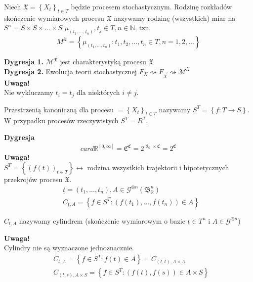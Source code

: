 \begin{defi}
Niech $ \mathfrak X=\left\{X_t\right\} _{t\in T}$ będzie procesem stochastycznym. Rodzinę rozkładów skończenie wymiarowych procesu $ \mathfrak X $ nazywamy rodzinę (wszystkich) miar na $ S^n=S\times S\times \dots\times S $ $ \mu_{(t_1,\dots,t_n)},t_j\in T,n\in \mathbb N $, tzn.
\begin{gather*}
M^\mathfrak X=\left\{\mu_{(t_1,\dots,t_n)}:t_1,t_2,\dots,t_n\in T,n=1,2,\dots \right\}
\end{gather*}
\end{defi}
\textbf{Dygresja 1.} $ \mathcal M^\mathfrak X $ jest charakterystyką procesu $ \mathfrak X $\\
\textbf{Dygresja 2.} Ewolucja teorii stochastycznej $ F_X\rightsquigarrow F_{\vec X}\rightsquigarrow\mathcal M^\mathfrak X $\\
\textbf{Uwaga!}\\
Nie wykluczamy $ t_i=t_j $ dla niektórych $ i\neq j $.
\begin{defi}
Przestrzenią kanoniczną dla procesu $ \mathfrak=\left\{X_t\right\} _{t\in T}$ nazywamy $ S^T=\left\{f:T\to S\right\} $. W przypadku procesów rzeczywistych $ S^T=R^T $.
\end{defi}
\textbf{Dygresja}
\begin{gather*}
card \mathbb R ^{[0,\infty ]}=\mathfrak C^\mathfrak C=2^{\aleph_0\times \mathfrak C}=2^\mathfrak C
\end{gather*}
\textbf{Uwaga!}\\
$ S^T=\left\{\left(f(t)\right)_{t\in T}\right\} \leftrightarrow $  rodzina wszystkich trajektorii i hipotetycznych przekrojów procesu $ \mathfrak X $.
\begin{align*}
&\underline t=\left(t_1,\dots,t_n\right), A\in\mathcal G^{\otimes n}\left(\mathfrak B_\mathbb R ^n\right)\\
&C_{\underline t,A}=\left\{f\in S^T:\left(f(t_1),\dots,f(t_n)\right)\in A\right\}
\end{align*}
\begin{defi}
$ C_{\underline t,A} $ nazywamy cylindrem (skończenie wymiarowym o bazie $ \underline t\in T^n $ i $ A\in \mathcal G^{\otimes n} $)
\end{defi}
\textbf{Uwaga!}\\
Cylindry nie są wyznaczone jednoznacznie.
\begin{align*}
&C_{t,A}=\left\{f\in S^T:f(t)\in A\right\}=C_{(t,t),A\times A}\\
&C_{(t,s),A\times S}=\left\{f\in S^T:\left(f(t),f(s)\right)\in A\times S\right\}
\end{align*}
